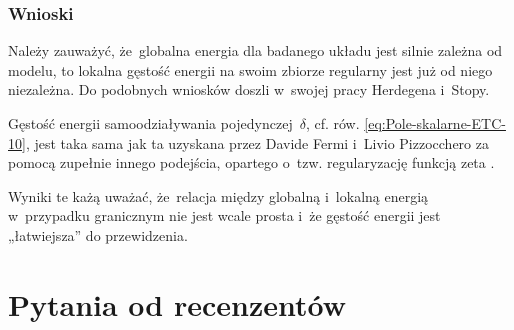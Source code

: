 \documentclass[10pt,t]{beamer}
\begin{document}
\begin{frame}
  \frametitle{Wnioski}


  Należy zauważyć, że~\alert{globalna} energia dla badanego układu
  jest silnie zależna od modelu, to \alert{lokalna gęstość energii}
  na swoim zbiorze regularny jest już od niego \alert{niezależna}.
  Do podobnych wniosków doszli w~swojej pracy Herdegena i~Stopy.

  Gęstość energii samoodziaływania pojedynczej~$\delta$, cf.
  rów. \eqref{eq:Pole-skalarne-ETC-10}, jest taka sama jak ta uzyskana
  przez  Davide Fermi i~Livio Pizzocchero za pomocą zupełnie innego
  podejścia, opartego o~tzw. regularyzację funkcją zeta
  \parencite{Fermi-Pizzocchero-Local-Casimir-Effect-for-a-Scalar-ETC-2018}.

  Wyniki te każą uważać, że~relacja między globalną i~lokalną energią
  w~przypadku granicznym nie jest wcale prosta i~że gęstość energii jest
  „łatwiejsza” do przewidzenia.

\end{frame}










\appendix





\section{Pytania od recenzentów}
\end{document}
